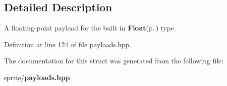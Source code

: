 \subsection{Detailed Description}
A floating-point payload for the built in {\bf Float}{\rm (p.\,\pageref{structsprite_1_1payloads_1_1Float})} type. 



Definition at line 124 of file payloads.hpp.

The documentation for this struct was generated from the following file:\begin{CompactItemize}
\item 
sprite/{\bf payloads.hpp}\end{CompactItemize}
